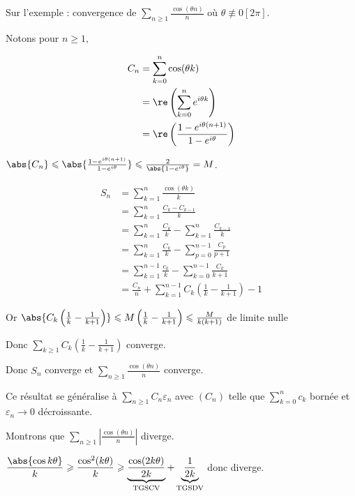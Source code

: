 Sur l'exemple : convergence de $\sum_{n \geqslant 1} \frac{\cos(\theta n)}{n}$ où $\theta \not \equiv 0 [2\pi]$.

Notons pour $n \geqslant 1, $

\begin{align*}
    C_n & = \sum_{k = 0}^{n} \cos(\theta k) \\
        & = \re \left( \sum_{k = 0}^{n} e^{i \theta k} \right) \\
        & = \re \left( \frac{1 - e^{i \theta (n + 1)}}{1 - e^{i \theta}} \right) 
\end{align*}

$\abs{C_n} \leqslant \abs{\frac{1 - e^{i \theta (n + 1)}}{1 - e^{i \theta}}} \leqslant \frac{2}{\abs{1 - e^{i \theta}}} = M$.

\begin{align*}
    S_n & = \sum_{k = 1}^{n} \frac{\cos(\theta k)}{k} \\
        & = \sum_{k = 1}^{n} \frac{C_k - C_{k - 1}}{k} \\
        & = \sum_{k = 1}^{n} \frac {C_k} k - \sum_{k = 1}^{n} \frac{C_{k - 1}}{k} \\
        & = \sum_{k = 1}^{n} \frac{C_k}{k} - \sum_{p = 0}^{n - 1} \frac{C_p}{p + 1} \\
        & = \sum_{k = 1}^{n - 1} \frac{c_k}{k} - \sum_{k = 0 }^{n - 1 } \frac{C_k}{k + 1} \\
        & = \frac{C_n} n + \sum_{k = 1}^{n - 1} C_k \left( \frac 1 k - \frac 1 {k + 1} \right) - 1 
\end{align*}

Or $\abs{C_k \left( \frac 1 k - \frac 1 {k + 1} \right)} \leqslant M \left( \frac 1 k - \frac 1 {k + 1} \right) \leqslant \frac M {k(k+1)}$
de limite nulle 

Donc $\sum_{k \geqslant 1} C_k \left( \frac 1 k - \frac 1 {k + 1} \right)$ converge. 

Donc $S_n$ converge et $\sum_{n \geqslant 1 } \frac{\cos(\theta n)}{n}$ converge.

Ce résultat se généralise à $\sum_{n \geqslant 1} C_n \varepsilon_n$ avec $(C_n)$ telle que $\displaystyle \sum_{k = 0 }^{n } c_k$ bornée et 
$\varepsilon_n \longrightarrow 0$ décroissante.

\lvspace Montrons que $\sum_{n \geqslant 1} \left| \frac{\cos(\theta n)}{n} \right|$ diverge. 

$\displaystyle \frac{\abs{\cos{k \theta }}}{ k } \geqslant  \frac{\cos^2(k \theta )}{k } \geqslant \underbrace{\frac{\cos(2k \theta)}{2k}}_{\text{TGSCV}} + \underbrace{\frac{ 1 }{ 2 k }}_{\text{TGSDV}}$ 
donc diverge. 

